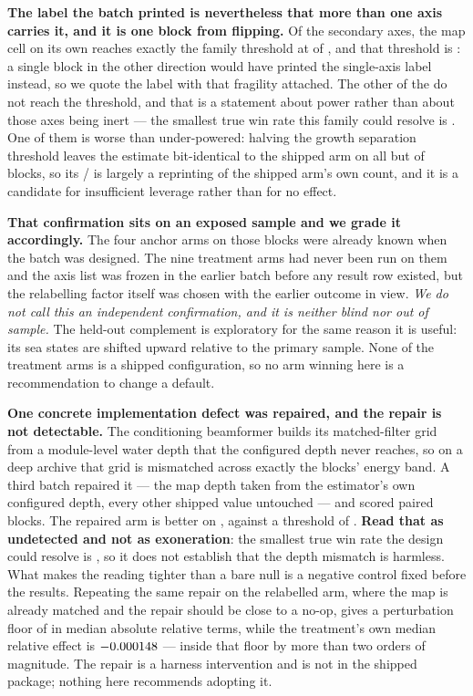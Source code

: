 \documentclass[review]{elsarticle}
\begin{document}
\textbf{The label the batch printed is nevertheless that more than one axis carries
it, and it is one block from flipping.} Of the \TTwelveArms{} secondary axes, the map
cell on its own reaches exactly the family threshold at \TTwelveCellWin{} of
\TTwelveN{}, and that threshold is \TTwelveSecThresh{}: a single block in the other
direction would have printed the single-axis label instead, so we quote the label
with that fragility attached. The other \TTwelveBelowThresh{} of the \TTwelveArms{}
do not reach the threshold, and that is a statement about power rather than about
those axes being inert --- the smallest true win rate this family could resolve is
\TTwelveSecMDE{}. One of them is worse than under-powered: halving the growth
separation threshold leaves the estimate bit-identical to the shipped arm on all but
\TTwelveMinDkDiff{} of \TTwelveN{} blocks, so its \TTwelveMinDkWin{}/\TTwelveN{} is
largely a reprinting of the shipped arm's own count, and it is a candidate for
insufficient leverage rather than for no effect.

\textbf{That confirmation sits on an exposed sample and we grade it accordingly.} The
four anchor arms on those \TTwelveN{} blocks were already known when the batch was
designed. The nine treatment arms had never been run on them and the axis list was
frozen in the earlier batch before any result row existed, but the relabelling factor
itself was chosen with the earlier outcome in view. \emph{We do not call this an
independent confirmation, and it is neither blind nor out of sample.} The held-out
complement is exploratory for the same reason it is useful: its sea states are
shifted upward relative to the primary sample. None of the treatment arms is a
shipped configuration, so no arm winning here is a recommendation to change a
default.

\textbf{One concrete implementation defect was repaired, and the repair is not
detectable.} The conditioning beamformer builds its matched-filter grid from a
module-level water depth that the configured depth never reaches, so on a deep
archive that grid is mismatched across exactly the blocks' energy band. A third batch
repaired it --- the map depth taken from the estimator's own configured depth, every
other shipped value untouched --- and scored \TThirteenN{} paired blocks. The
repaired arm is better on \TThirteenWin{}, against a threshold of \TThirteenThresh{}.
\textbf{Read that as undetected and not as exoneration}: the smallest true win rate
the design could resolve is \TThirteenMDE{}, so it does not establish that the depth
mismatch is harmless. What makes the reading tighter than a bare null is a negative
control fixed before the results. Repeating the same repair on the relabelled arm,
where the map is already matched and the repair should be close to a no-op, gives a
perturbation floor of \TThirteenFloor{} in median absolute relative terms, while the
treatment's own median relative effect is $-0.000148{}$ --- inside that floor
by more than two orders of magnitude. The repair is a harness intervention and is not
in the shipped package; nothing here recommends adopting it.
\end{document}
